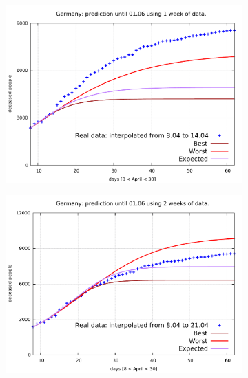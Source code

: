\documentclass[8pt]{article}
\begin{document}
\begin{figure}[h!]
  \centering
  \begin{subfigure}[b]{0.45\linewidth}
  \includegraphics[width=\linewidth]{../err10p_simulations/de/8-14/8-14.pdf}
  \end{subfigure}
  \begin{subfigure}[b]{0.45\linewidth}
    \includegraphics[width=\linewidth]{../err10p_simulations/de/8-21/8-21.pdf}
  \end{subfigure}
  \begin{subfigure}[b]{0.45\linewidth}

\end{subfigure}
\end{figure}
\end{document}
